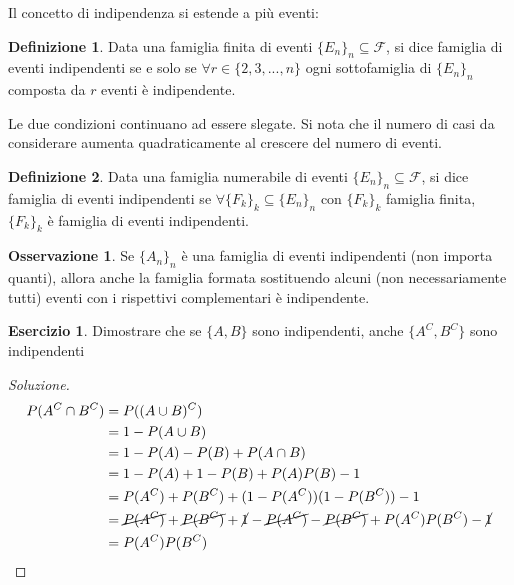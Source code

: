 \documentclass{article}
\theoremstyle{plain}
\theoremstyle{definition}
\newtheorem{definizione}{Definizione}[section]
\newtheorem{osservazione}{Osservazione}[section]
\newtheorem{esercizio}{Esercizio}[section]
\theoremstyle{remark}
\newenvironment{soluzione}
	{\renewcommand\qedsymbol{$\mathwitch*$}\begin{proof}[Soluzione]}
	{\end{proof}}
\renewcommand{\qedsymbol}{$\mathrightghost$}
\begin{document}
Il concetto di indipendenza si estende a più eventi:
\begin{definizione}
	Data una famiglia finita di eventi $\{E_n\}_n\subseteq\mathscr{F}$, si dice famiglia di eventi indipendenti se e solo se $\forall r\in \{2,3,...,n\}$ ogni sottofamiglia di $\{E_n\}_n$ composta da $r$ eventi è indipendente.
\end{definizione}
Le due condizioni continuano ad essere slegate. Si nota che il numero di casi da considerare aumenta quadraticamente al crescere del numero di eventi.
\begin{definizione}
	Data una famiglia numerabile di eventi $\{E_n\}_n\subseteq\mathscr{F}$, si dice famiglia di eventi indipendenti se $\forall \{F_k\}_k\subseteq\{E_n\}_n$ con $\{F_k\}_k$ famiglia finita, $\{F_k\}_k$ è famiglia di eventi indipendenti.
\end{definizione}
\begin{osservazione}
	Se $\{A_n\}_n$ è una famiglia di eventi indipendenti (non importa quanti), allora anche la famiglia formata sostituendo alcuni (non necessariamente tutti) eventi con i rispettivi complementari è indipendente.
\end{osservazione}
\begin{esercizio}
	Dimostrare che se $\{A,B\}$ sono indipendenti, anche $\{A^C,B^C\}$ sono indipendenti
	\begin{soluzione}
		\begin{align*}
			P(A^C\cap B^C)&=P((A\cup B)^C)\\
			&=1-P(A\cup B)\\
			&=1-P(A)-P(B)+P(A\cap B)\\
			&=1-P(A)+1-P(B)+P(A)P(B)-1\\
			&=P(A^C)+P(B^C)+(1-P(A^C))(1-P(B^C))-1\\
			&=\cancel{P(A^C)}+\cancel{P(B^C)}+\cancel{1}-\cancel{P(A^C)}-\cancel{P(B^C)}+P(A^C)P(B^C)-\cancel{1}\\
			&=P(A^C)P(B^C)\qedhere
		\end{align*}
	\end{soluzione}
\end{esercizio}
\end{document}
